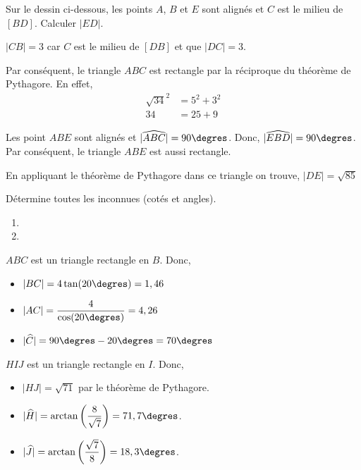 \documentclass[a4paper, 12pt, parskip=half-]{scrartcl}
\begin{document}
\begin{exercise}[points=3]
    Sur le dessin ci-dessous, les points $A$, $B$ et $E$ sont alignés et $C$ est le milieu de $[BD]$. Calculer $\left| ED \right|$.
    \begin{center}
        
    \end{center}
\end{exercise}
\begin{solution}
    $|CB| = 3$ car $C$ est le milieu de $[DB]$ et que $|DC| = 3$.

    Par conséquent, le triangle $ABC$ est rectangle par la réciproque du théorème de Pythagore. En effet,
    \begin{align*}
        \sqrt{34}^2 &= 5^2 + 3^2\\
        34 &= 25 + 9
    \end{align*}

    Les point $ABE$ sont alignés et $|\widehat{ABC}| = 90\degres$. Donc, $|\widehat{EBD}| = 90\degres$. Par conséquent, le triangle $ABE$ est aussi rectangle.

    En appliquant le théorème de Pythagore dans ce triangle on trouve,
    $|DE| = \sqrt{85}$
    \newpage
\end{solution}
\newpage
\begin{exercise}[points=8]
    Détermine toutes les inconnues (cotés et angles).
    \begin{enumerate}[cols=2]
        \item 
        \item 
    \end{enumerate}   
\end{exercise}
\begin{solution}
    \begin{tasks}
        \task
        $ABC$ est un triangle rectangle en $B$. Donc,
        \begin{itemize}
            \item $|BC| = 4\tan(20\degres) = 1,46$
            \item $|AC| = \dfrac{4}{\cos(20\degres)} = 4,26$
            \item $|\widehat{C}| = 90\degres- 20\degres = 70\degres$
        \end{itemize}
        \task
        $HIJ$ est un triangle rectangle en $I$. Donc,
        \begin{itemize}
            \item $|HJ| = \sqrt{71}$ par le théorème de Pythagore.
            \item $|\widehat{H}| = \arctan\left(\dfrac{8}{\sqrt{7}}\right)=71,7\degres$.
            \item $|\widehat{J}| = \arctan\left(\dfrac{\sqrt{7}}{8}\right)=18,3\degres$.
        \end{itemize}
    \end{tasks}
   
\end{solution}
\end{document}
